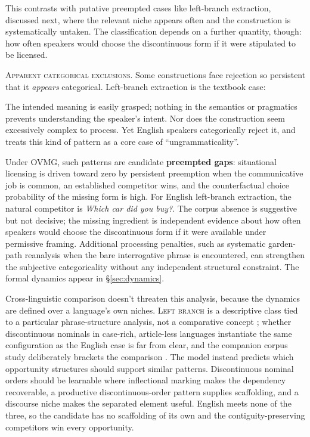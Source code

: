\documentclass[12pt,letterpaper]{article}
\newcommand{\term}[1]{\textsc{#1}}
\newcommand{\mention}[1]{\textit{#1}}
\begin{document}
This contrasts with putative preempted cases like left-branch extraction, discussed next, where the relevant niche appears often and the construction is systematically untaken. The classification depends on a further quantity, though: how often speakers would choose the discontinuous form if it were stipulated to be licensed.

\noindent\textsc{Apparent categorical exclusions.} Some constructions face rejection so persistent that it \emph{appears} categorical. Left-branch extraction is the textbook case:

\ea[*]{\mention{Which did you buy} [\_\_ \mention{car}]\mention{?}}\label{ex:LBC-cat}
\z

The intended meaning is easily grasped; nothing in the semantics or pragmatics prevents understanding the speaker's intent. Nor does the construction seem excessively complex to process. Yet English speakers categorically reject it, and \textcite[22]{Snyder2022} treats this kind of pattern as a core case of \enquote{ungrammaticality}.

Under OVMG, such patterns are candidate \textbf{preempted gaps}: situational
licensing is driven toward zero by persistent preemption when the communicative
job is common, an established competitor wins, and the counterfactual choice
probability of the missing form is high. For English left-branch extraction, the
natural competitor is \mention{Which car did you buy?}. The corpus absence is
suggestive but not decisive; the missing ingredient is independent evidence
about how often speakers would choose the discontinuous form if it were
available under permissive framing. Additional processing penalties, such as
systematic garden-path reanalysis when the bare
interrogative phrase is encountered, can strengthen the subjective categoricality
without any independent structural constraint. The formal dynamics appear in
\S\ref{sec:dynamics}.

Cross-linguistic comparison doesn't threaten this analysis, because the dynamics
are defined over a language's own niches. \term{Left branch} is a descriptive
class tied to a particular phrase-structure analysis, not a comparative concept
\autocite{haspelmath2010}; whether discontinuous nominals in case-rich,
article-less languages instantiate the same configuration as the English case is
far from clear, and the companion corpus study deliberately brackets the
comparison \autocite{reynolds2026lbe}. The model instead predicts which
opportunity structures should support similar patterns. Discontinuous nominal
orders should be learnable where inflectional marking makes the dependency
recoverable, a productive discontinuous-order pattern supplies scaffolding, and a
discourse niche makes the separated element useful. English meets none of the
three, so the candidate has no scaffolding of its own and the
contiguity-preserving competitors win every opportunity.
\end{document}
